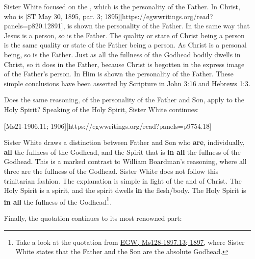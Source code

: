 Sister White focused on the , which is the personality of the Father. In Christ, who is [ST May 30, 1895, par. 3; 1895][https://egwwritings.org/read?panels=p820.12891], is shown the personality of the Father. In the same way that Jesus is a person, so is the Father. The quality or state of Christ being a person is the same quality or state of the Father being a person. As Christ is a personal being, so is the Father. Just as all the fullness of the Godhead bodily dwells in Christ, so it does in the Father, because Christ is begotten in the express image of the Father’s person. In Him is shown the personality of the Father. These simple conclusions have been asserted by Scripture in John 3:16 and Hebrews 1:3.

Does the same reasoning, of the personality of the Father and Son, apply to the Holy Spirit? Speaking of the Holy Spirit, Sister White continues:

[Ms21-1906.11; 1906][https://egwwritings.org/read?panels=p9754.18]

Sister White draws a distinction between Father and Son who \textbf{are}, individually, \textbf{all} the fullness of the Godhead, and the Spirit that is \textbf{in all} the fullness of the Godhead. This is a marked contrast to William Boardman’s reasoning, where all three are the fullness of the Godhead. Sister White does not follow this trinitarian fashion. The explanation is simple in light of the  and of Christ. The Holy Spirit is a spirit, and the spirit dwells \textbf{in} the flesh/body. The Holy Spirit is \textbf{in all} the fullness of the Godhead\footnote{Take a look at the quotation from \href{https://egwwritings.org/?ref=en_Ms128-1897.13&para=5426.19}{{EGW, Ms128-1897.13; 1897}}, where Sister White states that the Father and the Son are the absolute Godhead.}.

Finally, the quotation continues to its most renowned part:

